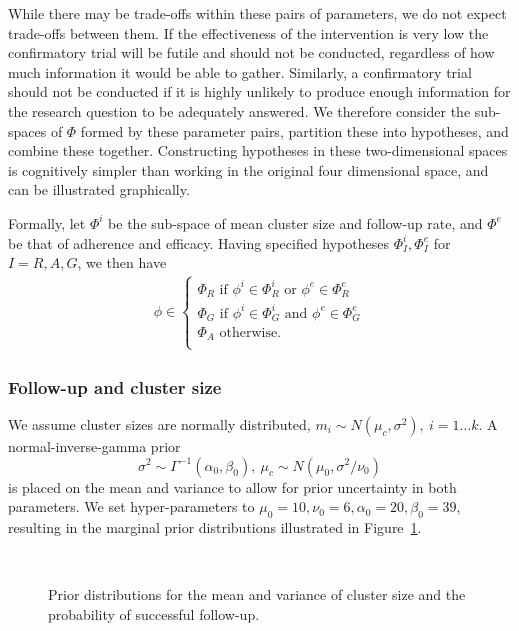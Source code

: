 \documentclass{article} %
\begin{document}
While there may be trade-offs within these pairs of parameters, we do not expect trade-offs between them. If the effectiveness of the intervention is very low the confirmatory trial will be futile and should not be conducted, regardless of how much information it would be able to gather. Similarly, a confirmatory trial should not be conducted if it is highly unlikely to produce enough information for the research question to be adequately answered. We therefore consider the sub-spaces of $\Phi$ formed by these parameter pairs, partition these into hypotheses, and combine these together. Constructing hypotheses in these two-dimensional spaces is cognitively simpler than working in the original four dimensional space, and can be illustrated graphically.

Formally, let $\Phi^i$ be the sub-space of mean cluster size and follow-up rate, and $\Phi^e$ be that of adherence and efficacy. Having specified hypotheses $\Phi^i_I, \Phi^e_I$ for $I = R,A,G$, we then have 
\begin{align}\label{eqn:comb_hyp}
\phi \in \begin{cases}
               \Phi_R \text{ if }  \phi^i \in \Phi^i_R \text{ or } \phi^e \in \Phi^e_R \\
               \Phi_G \text{ if }  \phi^i \in \Phi^i_G \text{ and } \phi^e \in \Phi^e_G \\
               \Phi_A \text{ otherwise}. \\
            \end{cases}
\end{align}

\subsubsection{Follow-up and cluster size}

We assume cluster sizes are normally distributed, $m_{i} \sim N(\mu_{c}, \sigma^{2}),~ i = 1 \ldots k$. A normal-inverse-gamma prior 
\begin{equation}
\sigma^{2} \sim \Gamma^{-1} (\alpha_{0}, \beta_{0}), ~ \mu_{c} \sim N(\mu_{0}, \sigma^{2}/\nu_{0})
\end{equation}
is placed on the mean and variance to allow for prior uncertainty in both parameters. We set hyper-parameters to $\mu_{0} = 10, \nu_{0} = 6, \alpha_{0} = 20, \beta_{0} = 39$, resulting in the marginal prior distributions illustrated in Figure~\ref{fig:priors1}.

\begin{figure}
   \centering
   \quad
   \\
   \quad
   \caption{Prior distributions for the mean and variance of cluster size and the probability of successful follow-up.}
   \label{fig:priors1}
\end{figure}
\end{document}
